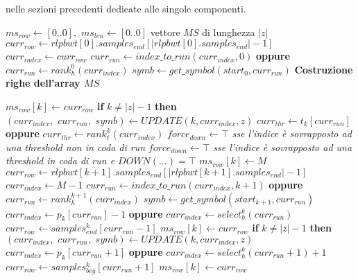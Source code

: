 nelle sezioni precedenti dedicate alle singole componenti. 
\begin{algorithm}
  \scriptsize
  \begin{algorithmic}[1]
    \State $ms_{row}\gets [0..0],\,\,ms_{len}\gets [0..0]$
    \Comment vettore $MS$ di lunghezza $|z|$
    \State $curr_{row}\gets
    rlpbwt[0].samples_{end}[|rlpbwt[0].samples_{end}|-1]$
    \State $curr_{index}\gets curr_{row}$
    \State  $curr_{run}\gets index\_to\_run(curr_{index},0)$ \textbf{oppure}
    $curr_{run}\gets rank_h^0(curr_{index})$    
    \State $symb\gets get\_symbol(start_0, curr_{run})$
    \Comment \textbf{Costruzione righe dell'array $MS$}
    \For {\textit{every} $k\in[0, |z|)$}

    \State $ms_{row}[k]\gets curr_{row}$
    \State \hspace{-1.1mm}\textbf{if} $k\neq |z|-1$ \textbf{then}
    $(curr_{index},\,\,curr_{run},\,\,symb)\gets UPDATE(k, curr_{index},z)$ 
    \Else
    \State  $curr_{thr}\gets t_k[curr_{run}]$ \textbf{oppure}
    $curr_{thr}\gets rank_t^k(curr_{index})$ 
    \State $force_{down} \gets \top$\textit{ sse l'indice è sovrapposto ad una
    threshold non in coda di run}
     \State $force_{down} \gets \top$\textit{ sse l'indice è sovrapposto ad una
    threshold in coda di run e $DOWN(\ldots)=\top$}
    \State $ms_{row}[k]\gets M$
    \State $curr_{row}\gets
    rlpbwt[k+1].samples_{end}[|rlpbwt[k+1].samples_{end}|-1]$
    \State $curr_{index}\gets M-1$
    \State $curr_{run}\gets index\_to\_run(curr_{index},k+1)$ \textbf{oppure}
    $curr_{run}\gets rank_h^{k+1}(curr_{index})$
    \State $symb\gets get\_symbol(start_{k+1}, curr_{run})$
    \EndIf
    \State $curr_{index}\gets p_k[curr_{run}]-1$ \textbf{oppure}
    $curr_{index}\gets select_h^{k}(curr_{run})$
    \State $curr_{row}\gets samples_{end}^k[curr_{run}-1]$
    \State $ms_{row}[k]\gets curr_{row}$
    \State \textbf{if} $k\neq |z|-1$ \textbf{then}
    $(curr_{index},\,\,curr_{run},\,\,symb)\gets UPDATE(k, curr_{index},z)$ 
    \Else
    \State $curr_{index}\gets  p_k[curr_{run}+1]$ \textbf{oppure}
    $curr_{index}\gets select_h^{k}(curr_{run}+1)+1$
    \State $curr_{row}\gets samples_{beg}^k[curr_{run}+1]$
    \State $ms_{row}[k]\gets curr_{row}$

\end{algorithmic}
\end{algorithm}

